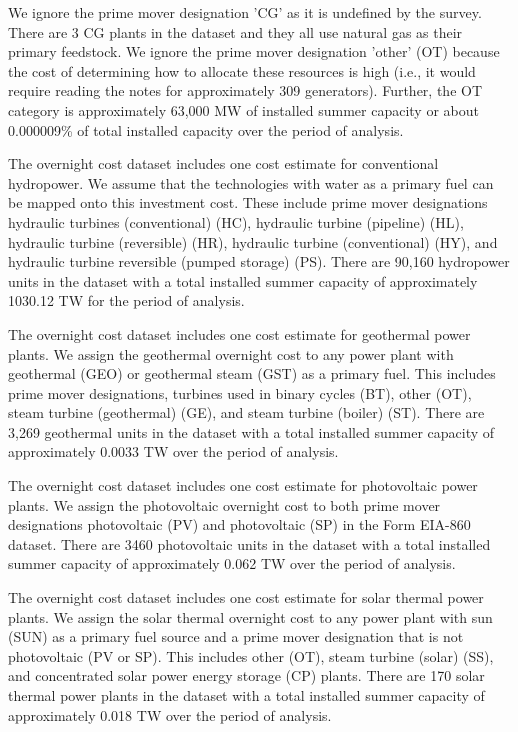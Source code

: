 \documentclass[10pt]{amsart}
\begin{document}
We ignore the prime mover designation 'CG' as it is undefined by the survey. 
There are 3 CG plants in the dataset and they all use natural gas as their primary feedstock.
We ignore the prime mover designation 'other' (OT) because the cost of determining how to allocate these resources is high (i.e., it would require reading the notes for approximately 309 generators).
Further, the OT category is approximately 63,000 MW of installed summer capacity or about 0.000009\% of total installed capacity over the period of analysis.  

The overnight cost dataset includes one cost estimate for conventional hydropower.
We assume that the technologies with water as a primary fuel can be mapped onto this investment cost.
These include prime mover designations hydraulic turbines (conventional) (HC), hydraulic turbine (pipeline) (HL), hydraulic turbine (reversible) (HR), hydraulic turbine (conventional) (HY), and hydraulic turbine reversible (pumped storage) (PS). 
There are 90,160 hydropower units in the dataset with a total installed summer capacity of approximately 1030.12 TW for the period of analysis. 

The overnight cost dataset includes one cost estimate for geothermal power plants. 
We assign the geothermal overnight cost to any power plant with geothermal (GEO) or geothermal steam (GST) as a primary fuel. 
This includes prime mover designations, turbines used in binary cycles (BT), other (OT), steam turbine (geothermal) (GE), and steam turbine (boiler) (ST).  
There are 3,269 geothermal units in the dataset with a total installed summer capacity of approximately 0.0033 TW over the period of analysis. 

The overnight cost dataset includes one cost estimate for photovoltaic power plants.
We assign the photovoltaic overnight cost to both prime mover designations photovoltaic (PV) and photovoltaic (SP) in the Form EIA-860 dataset.
There are 3460 photovoltaic units in the dataset with a total installed summer capacity of approximately 0.062 TW over the period of analysis. 

The overnight cost dataset includes one cost estimate for solar thermal power plants. 
We assign the solar thermal overnight cost to any power plant with sun (SUN) as a primary fuel source and a prime mover designation that is not photovoltaic (PV or SP).
This includes other (OT), steam turbine (solar) (SS), and concentrated solar power energy storage (CP) plants.  
There are 170 solar thermal power plants in the dataset with a total installed summer capacity of approximately 0.018 TW over the period of analysis.
\end{document}
